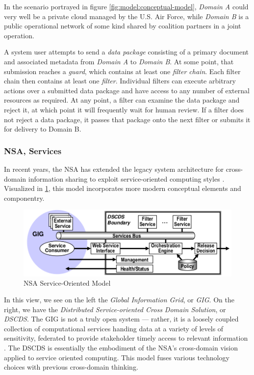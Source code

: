 \documentclass[12pt,letterpaper]{article}
\begin{document}
In the scenario portrayed in figure \ref{fig:model:conceptual-model}, \textit{Domain A} could very well be a private cloud managed by the U.S. Air Force, while \textit{Domain B} is a public operational network of some kind shared by coalition partners in a joint operation.

A system user attempts to send a \textit{data package} consisting of a primary document and associated metadata from \textit{Domain A} to \textit{Domain B}.  At some point, that submission reaches a \textit{guard}, which contains at least one \textit{filter chain}.  Each filter chain then contains at least one \textit{filter}.  Individual filters can execute arbitrary actions over a submitted data package and have access to any number of external resources as required.  At any point, a filter can examine the data package and reject it, at which point it will frequently wait for human review.  If a filter does not reject a data package, it passes that package onto the next filter or submits it for delivery to Domain B.

\subsubsection{NSA, Services}
In recent years, the NSA has extended the legacy system architecture for cross-domain information sharing to exploit service-oriented computing styles \cite{proposal:nsa-arch}.  Visualized in \ref{fig:model:conceptual-model-services}, this model incorporates more modern conceptual elements and componentry.

\begin{figure}[!t]
\centering
\includegraphics[width=5in]{nsa-arch}
\caption{NSA Service-Oriented Model}
\label{fig:model:conceptual-model-services}
\end{figure}

In this view, we see on the left the \textit{Global Information Grid}, or \textit{GIG}.  On the right, we have the \textit{Distributed Service-oriented Cross Domain Solution}, or \textit{DSCDS}.  The GIG is not a truly open system --- rather, it is a loosely coupled collection of computational services handing data at a variety of levels of sensitivity, federated to provide stakeholder timely access to relevant information \cite{proposal:gig-arch}.  The DSCDS is essentially the embodiment of the NSA's cross-domain vision applied to service oriented computing.  This model fuses various technology choices with previous cross-domain thinking.
\end{document}
